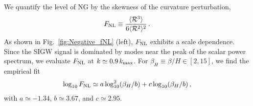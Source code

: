 \documentclass[twocolumn,superscriptaddress,aps,preprintnumbers,amsmath,amssymb,prl,footinbib]{revtex4-2}
\begin{document}
We quantify the level of NG by the skewness of the curvature perturbation,
\cite{Luo:1992er,Komatsu:2001rj}
\begin{equation}
F_{\rm NL}
\equiv
\frac{\langle \mathcal{R}^3 \rangle}
{6 \langle \mathcal{R}^2 \rangle^2} \,.
\end{equation}
As shown in Fig.~\ref{fig:Negative_fNL} (left), $F_{\rm NL}$ exhibits a scale dependence.
Since the SIGW signal is dominated by modes near the peak of the scalar power spectrum, we evaluate $F_{\rm NL}$ at
$k\simeq 0.9\,k_{\rm max}$.
For $\beta_H\equiv \beta/H \in [2,15]$, we find the empirical fit
\begin{equation}
\log_{10} F_{\rm NL}
\simeq
a \log_{10}^2(\beta_H/b)
+ c \log_{10}(\beta_H/b) \,,
\end{equation}
with $a\simeq -1.34$, $b\simeq 3.67$, and $c\simeq 2.95$.
\end{document}

